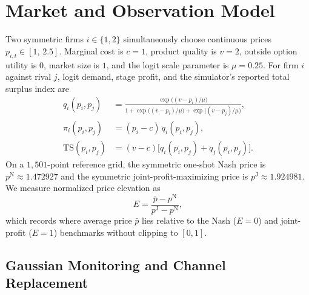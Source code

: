 \section{Market and Observation Model}

Two symmetric firms $i\in\{1,2\}$ simultaneously choose continuous prices $p_{i,t}\in[1,\,2.5]$. Marginal cost is $c=1$, product quality is $v=2$, outside option utility is $0$, market size is $1$, and the logit scale parameter is $\mu=0.25$. For firm $i$ against rival $j$, logit demand, stage profit, and the simulator's reported total surplus index are
\begin{align}
q_i(p_i,p_j) &= \frac{\exp\!\bigl((v-p_i)/\mu\bigr)}
{1+\exp\!\bigl((v-p_i)/\mu\bigr)+\exp\!\bigl((v-p_j)/\mu\bigr)},\\[3pt]
\pi_i(p_i,p_j) &= (p_i - c)\,q_i(p_i,p_j),\\[3pt]
\mathrm{TS}(p_i,p_j) &= (v-c)\bigl[q_i(p_i,p_j)+q_j(p_i,p_j)\bigr].
\end{align}
On a $1{,}501$-point reference grid, the symmetric one-shot Nash price is $p^{\mathrm{N}}\approx 1.472927$ and the symmetric joint-profit-maximizing price is $p^{\mathrm{J}}\approx 1.924981$. We measure normalized price elevation as
\[
E = \frac{\bar{p}-p^{\mathrm{N}}}{p^{\mathrm{J}}-p^{\mathrm{N}}},
\]
which records where average price $\bar{p}$ lies relative to the Nash ($E=0$) and joint-profit ($E=1$) benchmarks without clipping to $[0,1]$.

\subsection{Gaussian Monitoring and Channel Replacement}


